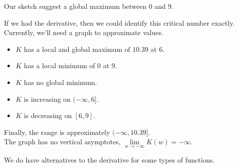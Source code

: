 \documentclass{ximera}
\begin{document}
\begin{example}
\begin{explanation}
\begin{image}
\end{image}


Our sketch suggest a global maximum between $0$ and $9$.


If we had the derivative, then we could identify this critical number exactly. Currently, we'll need a graph to approximate values.




\begin{center}
\end{center}





\begin{itemize}
\item $K$ has a local and global maximum of $10.39$ at $6$.
\item $K$ has a local minimum of $0$ at $9$.
\item $K$ has no global minimum.
\end{itemize}




\begin{itemize}
\item $K$ is increasing on $(-\infty, 6]$.
\item $K$ is decreasing on $[6, 9]$.
\end{itemize}


Finally, the range is approximately $(-\infty, 10.39]$. \\


The graph has no vertical asymptotes, $\lim\limits_{w \to -\infty} K(w) = -\infty.$

\end{explanation}

\end{example}



We do have alternatives to the derivative for some types of functions. \\
\end{document}

